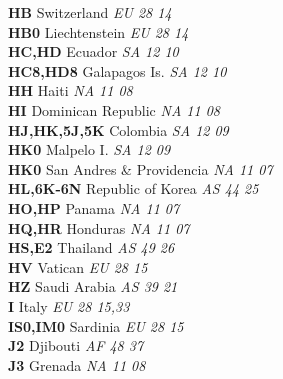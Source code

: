 ﻿\documentclass[landscape,a4paper]{article}
\begin{document}
\begin{multicols}{6}
\textbf{HB                      } Switzerland                        \emph{ EU     28     14    } \\
\textbf{HB0                     } Liechtenstein                      \emph{ EU     28     14    } \\
\textbf{HC,HD                   } Ecuador                            \emph{ SA     12     10    } \\
\textbf{HC8,HD8                 } Galapagos Is.                      \emph{ SA     12     10    } \\
\textbf{HH                      } Haiti                              \emph{ NA     11     08    } \\
\textbf{HI                      } Dominican Republic                 \emph{ NA     11     08    } \\
\textbf{HJ,HK,5J,5K             } Colombia                           \emph{ SA     12     09    } \\
\textbf{HK0                     } Malpelo I.                         \emph{ SA     12     09    } \\
\textbf{HK0                     } San Andres \& Providencia          \emph{ NA     11     07    } \\
\textbf{HL,6K-6N                } Republic of Korea                  \emph{ AS     44     25    } \\
\textbf{HO,HP                   } Panama                             \emph{ NA     11     07    } \\
\textbf{HQ,HR                   } Honduras                           \emph{ NA     11     07    } \\
\textbf{HS,E2                   } Thailand                           \emph{ AS     49     26    } \\
\textbf{HV                      } Vatican                            \emph{ EU     28     15    } \\
\textbf{HZ                      } Saudi Arabia                       \emph{ AS     39     21    } \\
\textbf{I                       } Italy                              \emph{ EU     28     15,33 } \\
\textbf{IS0,IM0                 } Sardinia                           \emph{ EU     28     15    } \\
\textbf{J2                      } Djibouti                           \emph{ AF     48     37    } \\
\textbf{J3                      } Grenada                            \emph{ NA     11     08    } \\

\end{multicols}
\end{document}
